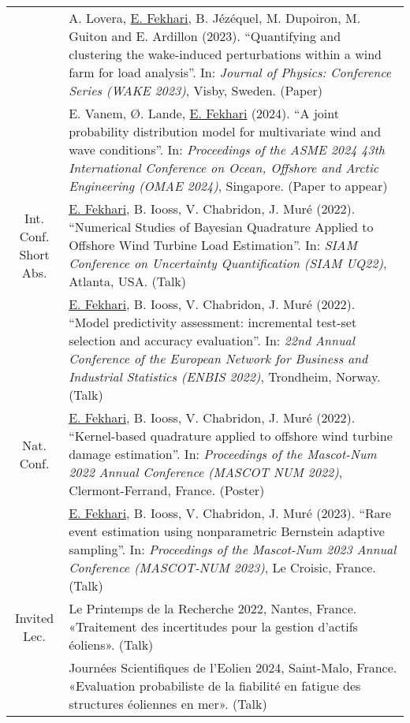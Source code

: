 \begin{center}
\begin{tabularx}{\textwidth}{c X}
                    & A. Lovera, \underline{E. Fekhari}, B. Jézéquel, M. Dupoiron, M. Guiton and E. Ardillon (2023). 
                    ``Quantifying and clustering the wake-induced perturbations within a wind farm for load analysis''. 
                    In: \textit{Journal of Physics: Conference Series (WAKE 2023)}, Visby, Sweden. (Paper)\\
                    
                    & E. Vanem, \O{}. Lande, \underline{E. Fekhari} (2024). 
                    ``A joint probability distribution model for multivariate wind and wave conditions''.
                    In: \textit{Proceedings of the ASME 2024 43th International Conference on Ocean, Offshore and Arctic Engineering (OMAE 2024)}, Singapore. (Paper to appear)\\
        \hline
\shortstack{Int. Conf.\\Short Abs.}  & \underline{E. Fekhari}, B. Iooss, V. Chabridon, J. Muré (2022).
                    ``Numerical Studies of Bayesian Quadrature Applied to Offshore Wind Turbine Load Estimation''.
                    In: \textit{SIAM Conference on Uncertainty Quantification (SIAM UQ22)}, Atlanta, USA. (Talk)\\
        
                    & \underline{E. Fekhari}, B. Iooss, V. Chabridon, J. Muré (2022). 
                    ``Model predictivity assessment: incremental test-set selection and accuracy evaluation''.
                    In: \textit{22nd Annual Conference of the European Network for Business and Industrial Statistics (ENBIS 2022)}, Trondheim, Norway. (Talk)\\
        \hline
        Nat. Conf.  & \underline{E. Fekhari}, B. Iooss, V. Chabridon, J. Muré (2022).
                    ``Kernel-based quadrature applied to offshore wind turbine damage estimation''. 
                    In: \textit{Proceedings of the Mascot-Num 2022 Annual Conference (MASCOT NUM 2022)}, Clermont-Ferrand, France. (Poster)\\
        
                    & \underline{E. Fekhari}, B. Iooss, V. Chabridon, J. Muré (2023).
                    ``Rare event estimation using nonparametric Bernstein adaptive sampling''. 
                    In: \textit{Proceedings of the Mascot-Num 2023 Annual Conference (MASCOT-NUM 2023)}, Le Croisic, France. (Talk)\\
        \hline
        Invited Lec.& Le Printemps de la Recherche 2022, Nantes, France. «Traitement des incertitudes pour la gestion d’actifs éoliens». (Talk)\\

                    & Journées Scientifiques de l’Eolien 2024, Saint-Malo, France. «Evaluation probabiliste de la fiabilité en fatigue des structures éoliennes en mer». (Talk)
                    
        \end{tabularx}    
\end{center}



